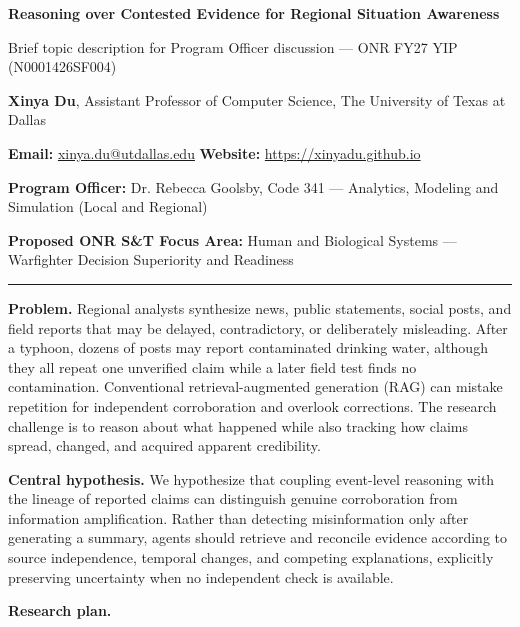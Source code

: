 \documentclass[11pt,letterpaper]{article}
\newcommand{\head}[1]{\textbf{#1}\enspace}
\newcommand{\POline}{Dr. Rebecca Goolsby, Code 341 --- Analytics, Modeling and Simulation (Local and Regional)}
\newcommand{\FocusArea}{Human and Biological Systems --- Warfighter Decision Superiority and Readiness}
\begin{document}
\begin{center}
{\fontsize{14}{16}\selectfont\bfseries Reasoning over Contested Evidence for Regional Situation Awareness\par}
\vspace{2pt}
{\small Brief topic description for Program Officer discussion --- ONR FY27 YIP (N0001426SF004)}
\end{center}
\vspace{-2pt}
{\small \textbf{Xinya Du}, Assistant Professor of Computer Science, The University of Texas at Dallas\par
\textbf{Email:} \href{mailto:xinya.du@utdallas.edu}{xinya.du@utdallas.edu} \quad \textbf{Website:} \href{https://xinyadu.github.io}{https://xinyadu.github.io}\par
\textbf{Program Officer:} \POline\par
\textbf{Proposed ONR S\&T Focus Area:} \FocusArea\par}
\vspace{2pt}\hrule\vspace{5pt}
\head{Problem.} Regional analysts synthesize news, public statements, social posts, and field reports that may be delayed, contradictory, or deliberately misleading. After a typhoon, dozens of posts may report contaminated drinking water, although they all repeat one unverified claim while a later field test finds no contamination. Conventional retrieval-augmented generation (RAG) can mistake repetition for independent corroboration and overlook corrections. The research challenge is to reason about what happened while also tracking how claims spread, changed, and acquired apparent credibility.
\par\head{Central hypothesis.} We hypothesize that coupling event-level reasoning with the lineage of reported claims can distinguish genuine corroboration from information amplification. Rather than detecting misinformation only after generating a summary, agents should retrieve and reconcile evidence according to source independence, temporal changes, and competing explanations, explicitly preserving uncertainty when no independent check is available.
\par\head{Research plan.}
\end{document}
